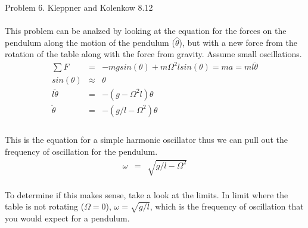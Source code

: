 \documentclass[11pt]{amsart}
\begin{document}
Problem 6. Kleppner and Kolenkow 8.12 \\ \\
This problem can be analzed by looking at the equation for the forces on the pendulum along the motion of the pendulum ($\hat{\theta}$), but with a new force from the rotation of the table along with the force from gravity. Assume small oscillations.\\
\begin{eqnarray*}
\sum{F} &=& -mgsin(\theta)+m\Omega^{2}lsin(\theta) = ma = ml\ddot{\theta} \\
sin(\theta) &\approx& \theta \\
l\ddot{\theta} &=& -(g-\Omega^{2}l)\theta \\
\ddot{\theta} &=& -(g/l-\Omega^{2})\theta \\
\end{eqnarray*} \\
This is the equation for a simple harmonic oscillator thus we can pull out the frequency of oscillation for the pendulum. \\
\begin{eqnarray*}
\omega &=& \sqrt{g/l-\Omega^{2}} 
\end{eqnarray*} \\
To determine if this makes sense, take a look at the limits. In limit where the table is not rotating ($\Omega=0$), $\omega=\sqrt{g/l}$, which is the frequency of oscillation that you would expect for a pendulum. \\
\end{document}
